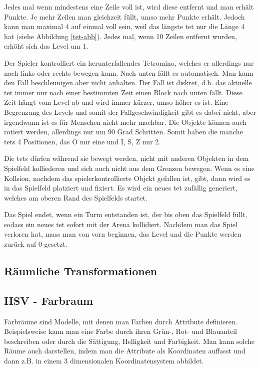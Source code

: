 \documentclass[11pt]{article}
\newcommand{\refabb}[1]{Abbildung \ref{#1}}
\begin{document}
Jedes mal wenn mindestens eine Zeile voll ist, wird diese entfernt und man erhält Punkte.
Je mehr Zeilen man gleichzeit füllt, umso mehr Punkte erhält. Jedoch kann man maximal 4 auf einmal voll sein, weil das längste \gls{tet} 
nur die Länge 4 hat (siehe \refabb{tet-abb}). Jedes mal, wenn 10 Zeilen entfernt wurden, erhöht sich das Level um 1.\cite{TetrisWiki}

Der Spieler kontrolliert ein herunterfallendes Tetromino, welches er allerdings nur nach links oder rechts bewegen kann.
Nach unten fällt es automatisch. Man kann den Fall beschleunigen aber nicht anhalten. 
Der Fall ist diskret, d.h. das aktuelle \gls{tet} immer nur nach einer bestimmten Zeit einen Block nach unten fällt.
Diese Zeit hängt vom Level ab und wird immer kürzer, umso höher es ist. Eine Begrenzung des Levels und somit der Fallgeschwindigkeit gibt es dabei nicht,
aber irgendwann ist es für Menschen nicht mehr machbar.
Die Objekte können auch rotiert werden, allerdings nur um 90 Grad Schritten. Somit haben die manche \glspl{tet} 4 Positionen, das O nur eine und I, S, Z nur 2.

Die \glspl{tet} dürfen während sie bewegt werden, nicht mit anderen Objekten in dem Spielfeld kolliederen und sich auch nicht aus dem Grenzen bewegen.
Wenn es eine Kollsion, nachdem das spielerkontrollierte Objekt gefallen ist, gibt, dann wird es in das Spielfeld platziert und fixiert. Es wird ein neues \gls{tet} 
zufällig generiert, welches am oberen Rand des Spielfelds startet.

Das Spiel endet, wenn ein Turm entstanden ist, der bis oben das Spielfeld füllt, sodass ein neues \gls{tet} sofort mit der Arena kollidiert.
Nachdem man das Spiel verloren hat, muss man von vorn beginnen, das Level und die Punkte werden zurück auf 0 gesetzt.

\subsection{Räumliche Transformationen}

\subsection{HSV - Farbraum}

Farbräume sind Modelle, mit denen man Farben durch Attribute definieren. 
Beispielsweise kann man eine Farbe durch ihren Grün-, Rot- und Blauanteil beschreiben oder 
durch die Sättigung, Helligkeit und Farbigkeit. Man kann solche Räume auch darstellen, indem man 
die Attribute als Koordinaten auffasst und dann z.B. in einem 3 dimensionalen Koordinatensystem abbildet. 
\cite{CS1}
\end{document}
